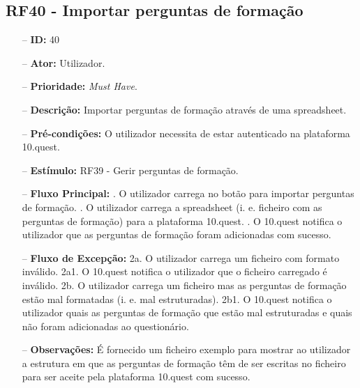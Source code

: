 \subsection{RF40 - Importar perguntas de formação}
\begin{itemize}
	\item[--] \textbf{ID:} 40
	\item[--]  \textbf{Ator:} Utilizador.
	\item[--]  \textbf{Prioridade:} \textit{Must Have}.
	\item[--]  \textbf{Descrição:} Importar perguntas de formação através de uma spreadsheet. 
	\item[--]  \textbf{Pré-condições:} O utilizador necessita de estar autenticado na plataforma 10.quest.
	\item[--]  \textbf{Estímulo:}  RF39 - Gerir perguntas de formação.
	\item[--]  \textbf{Fluxo Principal:} 
		. O utilizador carrega no botão para importar perguntas de formação.
		. O utilizador carrega a spreadsheet (i. e. ficheiro com as perguntas de formação) para a plataforma 10.quest.
		. O 10.quest notifica o utilizador que as perguntas de formação foram adicionadas com sucesso.
	\item[--]  \textbf{Fluxo de Excepção:} 
		\subitem 2a. O utilizador carrega um ficheiro com formato inválido.
		\subitem 2a1. O 10.quest notifica o utilizador que o ficheiro carregado é inválido.
		\subitem 2b. O utilizador carrega um ficheiro mas as perguntas de formação estão mal formatadas (i. e. mal estruturadas).
		\subitem 2b1. O 10.quest notifica o utilizador quais as perguntas de formação que estão mal estruturadas e quais não foram adicionadas ao questionário.
		\begin{comment}
		\subitem 3a. O 10.quest não consegue efetuar o pedido à API do TCG devido a uma falha na conexão.
		\subitem 3a1. O 10.quest notifica o utilizador que ocorreu uma falha na conexão.
		\subitem 3b. O serviço do TCG (API) está indisponível.
		\subitem 3b1. O 10.quest notifica o utilizador que o serviço do TCG está temporariamente indisponível. 
		\end{comment}
	\item[--]  \textbf{Observações:} É fornecido um ficheiro exemplo para mostrar ao utilizador a estrutura em que as perguntas de formação  têm de ser escritas no ficheiro para ser aceite pela plataforma 10.quest com sucesso.
\end{itemize}
\newpage

